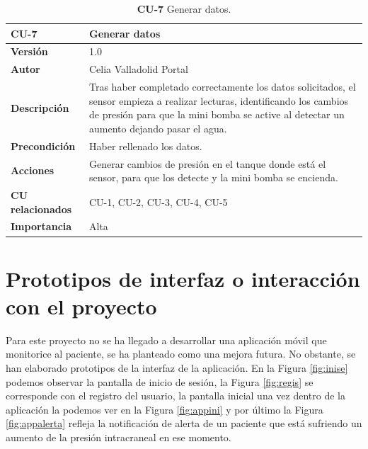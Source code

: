 \begin{table}[H]
	\centering
	\begin{tabularx}{\linewidth}{ p{} p{} }
		\toprule
            \rowcolor[HTML]{B0E0E6}
		\textbf{CU-7}    & \textbf{Generar datos}\\
		\toprule
		\textbf{Versión}              & 1.0    \\
		\textbf{Autor}                & Celia Valladolid Portal \\
		\textbf{Descripción}          & Tras haber completado correctamente los datos solicitados, el sensor empieza a realizar lecturas, identificando los cambios de presión para que la mini bomba se active al detectar un aumento dejando pasar el agua.  \\
		\textbf{Precondición}         & Haber rellenado los datos. \\
		\textbf{Acciones}             & Generar cambios de presión en el tanque donde está el sensor, para que los detecte y la mini bomba se encienda. \\
		\textbf{CU relacionados}        & CU-1, CU-2, CU-3, CU-4, CU-5 \\
		\textbf{Importancia}          & Alta  \\
		\bottomrule
	\end{tabularx}
	\caption{\textbf{CU-7} Generar datos.}
        \label{tab:cu7}
\end{table}
\newpage


\section{Prototipos de interfaz o interacción con el proyecto}
Para este proyecto no se ha llegado a desarrollar una aplicación móvil que monitorice al paciente, se ha planteado como una mejora futura. No obstante, se han elaborado prototipos de la interfaz de la aplicación. En la Figura \ref{fig:inise} podemos observar la pantalla de inicio de sesión, la Figura \ref{fig:regis} se corresponde con el registro del usuario, la pantalla inicial una vez dentro de la aplicación la podemos ver en la Figura \ref{fig:appini} y por último la Figura \ref{fig:appalerta} refleja la notificación de alerta de un paciente que está sufriendo un aumento de la presión intracraneal en ese momento.

